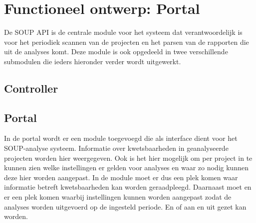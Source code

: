 \chapter{Functioneel ontwerp: Portal}\label{ch:impl-Portal}
De SOUP API is de centrale module voor het systeem dat verantwoordelijk is voor het periodiek scannen van de projecten en het parsen van de rapporten die uit de analyses komt. Deze module is ook opgedeeld in twee verschillende submodulen die ieders hieronder verder wordt uitgewerkt.

\section{Controller}\label{sec:controller}


\section{Portal}\label{sec:portal}
In de portal wordt er een module toegevoegd die als interface dient voor het SOUP-analyse systeem. Informatie over kwetsbaarheden in geanalyseerde projecten worden hier weergegeven. Ook is het hier mogelijk om per project in te kunnen zien welke instellingen er gelden voor analyses en waar zo nodig kunnen deze hier worden aangepast.
In de module moet er dus een plek komen waar informatie betreft kwetsbaarheden kan worden geraadpleegd. Daarnaast moet en er een plek komen waarbij instellingen kunnen worden aangepast zodat de analyses worden uitgevoerd op de ingesteld periode. En of aan en uit gezet kan worden.

